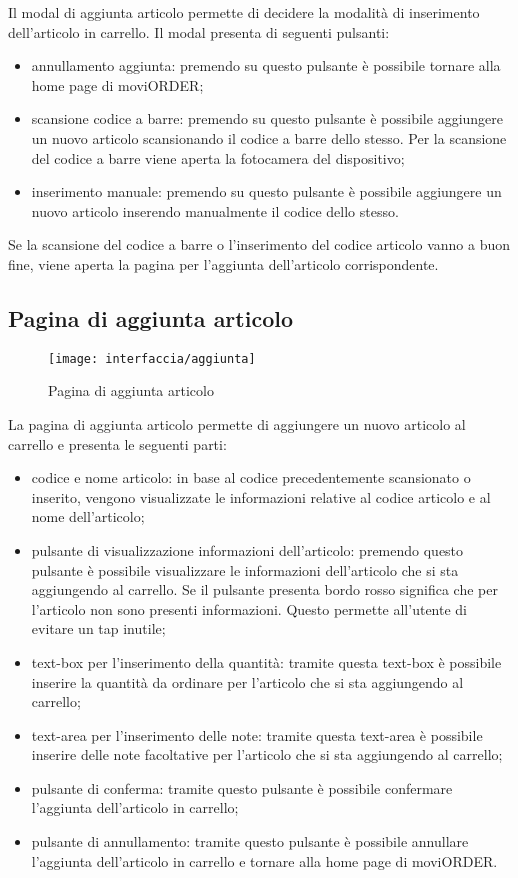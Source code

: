 Il modal di aggiunta articolo permette di decidere la modalità di inserimento dell'articolo in carrello. Il modal presenta di seguenti pulsanti:
\begin{itemize}
	\item annullamento aggiunta: premendo su questo pulsante è possibile tornare alla home page di moviORDER;
	\item scansione codice a barre: premendo su questo pulsante è possibile aggiungere un nuovo articolo scansionando il codice a barre dello stesso. Per la scansione del codice a barre viene aperta la fotocamera del dispositivo;
	\item inserimento manuale: premendo su questo pulsante è possibile aggiungere un nuovo articolo inserendo manualmente il codice dello stesso.
\end{itemize}
Se la scansione del codice a barre o l'inserimento del codice articolo vanno a buon fine, viene aperta la pagina per l'aggiunta dell'articolo corrispondente.

\subsection{Pagina di aggiunta articolo}

\begin{figure}[!h] 
    \centering 
    \texttt{[image: interfaccia/aggiunta]} 
    \caption{Pagina di aggiunta articolo}
\end{figure}

La pagina di aggiunta articolo permette di aggiungere un nuovo articolo al carrello e presenta le seguenti parti:
\begin{itemize}
	\item codice e nome articolo: in base al codice precedentemente scansionato o inserito, vengono visualizzate le informazioni relative al codice articolo e al nome dell'articolo;
	\item pulsante di visualizzazione informazioni dell'articolo: premendo questo pulsante è possibile visualizzare le informazioni dell'articolo che si sta aggiungendo al carrello. Se il pulsante presenta bordo rosso significa che per l'articolo non sono presenti informazioni. Questo permette all'utente di evitare un tap inutile;
	\item text-box per l'inserimento della quantità: tramite questa text-box è possibile inserire la quantità da ordinare per l'articolo che si sta aggiungendo al carrello;
	\item text-area per l'inserimento delle note: tramite questa text-area è possibile inserire delle note facoltative per l'articolo che si sta aggiungendo al carrello;
	\item pulsante di conferma: tramite questo pulsante è possibile confermare l'aggiunta dell'articolo in carrello;
	\item pulsante di annullamento: tramite questo pulsante è possibile annullare l'aggiunta dell'articolo in carrello e tornare alla home page di moviORDER.
\end{itemize}

